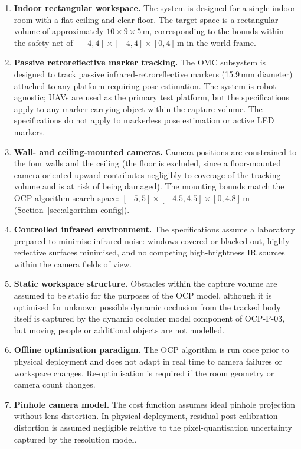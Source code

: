 \begin{enumerate}

    \item \textbf{Indoor rectangular workspace.} The system is designed for a single indoor room with a flat ceiling and clear floor. The target space is a rectangular volume of approximately $10 \times 9 \times 5$\,m, corresponding to the bounds within the safety net of $[-4, 4] \times [-4, 4] \times [0, 4]$\,m in the world frame.

    \item \textbf{Passive retroreflective marker tracking.} The \gls{OMC} subsystem is designed to track passive infrared-retroreflective markers (15.9\,mm diameter) attached to any platform requiring pose estimation. The system is robot-agnostic; \gls{UAV}s are used as the primary test platform, but the specifications apply to any marker-carrying object within the capture volume. The specifications do not apply to markerless pose estimation or active LED markers.

    \item \textbf{Wall- and ceiling-mounted cameras.} Camera positions are constrained to the four walls and the ceiling (the floor is excluded, since a floor-mounted camera oriented upward contributes negligibly to coverage of the tracking volume and is at risk of being damaged). The mounting bounds match the OCP algorithm search space: $[-5, 5] \times [-4.5, 4.5] \times [0, 4.8]$\,m (Section~\ref{sec:algorithm-config}).

    \item \textbf{Controlled infrared environment.} The specifications assume a laboratory prepared to minimise infrared noise: windows covered or blacked out, highly reflective surfaces minimised, and no competing high-brightness IR sources within the camera fields of view.

    \item \textbf{Static workspace structure.} Obstacles within the capture volume are assumed to be static for the purposes of the \gls{OCP} model, although it is optimised for unknown possible dynamic occlusion from the tracked body itself is captured by the dynamic occluder model component of OCP-P-03, but moving people or additional objects are not modelled.

    \item \textbf{Offline optimisation paradigm.} The \gls{OCP} algorithm is run once prior to physical deployment and does not adapt in real time to camera failures or workspace changes. Re-optimisation is required if the room geometry or camera count changes.

    \item \textbf{Pinhole camera model.} The cost function assumes ideal pinhole projection without lens distortion. In physical deployment, residual post-calibration distortion is assumed negligible relative to the pixel-quantisation uncertainty captured by the resolution model.

\end{enumerate}
